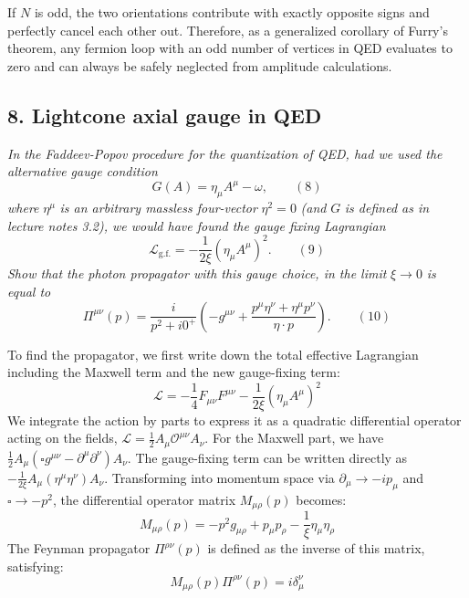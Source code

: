 If $N$ is odd, the two orientations contribute with exactly opposite signs and perfectly cancel each other out. Therefore, as a generalized corollary of Furry's theorem, any fermion loop with an odd number of vertices in QED evaluates to zero and can always be safely neglected from amplitude calculations.

\subsection*{8. Lightcone axial gauge in QED}

\begin{center}
    \textit{In the Faddeev-Popov procedure for the quantization of QED, had we used the alternative gauge condition}
    \[
        G(A) = \eta_\mu A^\mu - \omega, \qquad (8)
    \]
    \textit{where} $\eta^\mu$ \textit{is an arbitrary massless four-vector} $\eta^2 = 0$ \textit{(and} $G$ \textit{is defined as in lecture notes 3.2), we would have found the gauge fixing Lagrangian}
    \[
        \mathcal{L}_{\text{g.f.}} = -\frac{1}{2\xi} (\eta_\mu A^\mu)^2. \qquad (9)
    \]
    \textit{Show that the photon propagator with this gauge choice, in the limit } $\xi \to 0$ \textit{ is equal to}
    \[
        \Pi^{\mu\nu}(p) = \frac{i}{p^2 + i0^+} \left( -g^{\mu\nu} + \frac{p^\mu \eta^\nu + \eta^\mu p^\nu}{\eta \cdot p} \right). \qquad (10)
    \]
\end{center}

To find the propagator, we first write down the total effective Lagrangian including the Maxwell term and the new gauge-fixing term:
\[
    \mathcal{L} = -\frac{1}{4}F_{\mu\nu}F^{\mu\nu} - \frac{1}{2\xi}(\eta_\mu A^\mu)^2
\]
We integrate the action by parts to express it as a quadratic differential operator acting on the fields, $\mathcal{L} = \frac{1}{2} A_\mu \mathcal{O}^{\mu\nu} A_\nu$. For the Maxwell part, we have $\frac{1}{2} A_\mu (\square g^{\mu\nu} - \partial^\mu \partial^\nu) A_\nu$. The gauge-fixing term can be written directly as $-\frac{1}{2\xi} A_\mu (\eta^\mu \eta^\nu) A_\nu$.
Transforming into momentum space via $\partial_\mu \to -ip_\mu$ and $\square \to -p^2$, the differential operator matrix $M_{\mu\rho}(p)$ becomes:
\[
    M_{\mu\rho}(p) = -p^2 g_{\mu\rho} + p_\mu p_\rho - \frac{1}{\xi} \eta_\mu \eta_\rho
\]
The Feynman propagator $\Pi^{\rho\nu}(p)$ is defined as the inverse of this matrix, satisfying:
\[
    M_{\mu\rho}(p) \Pi^{\rho\nu}(p) = i \delta_\mu^\nu
\]


